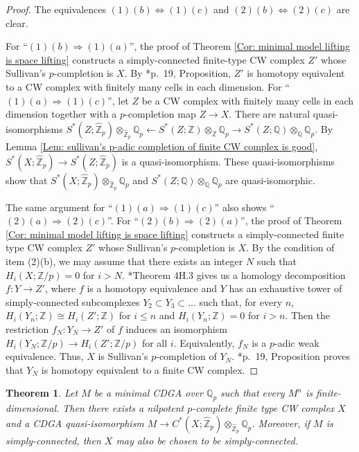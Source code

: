 \documentclass[11pt]{amsart}
\newtheorem{theorem}{Theorem}[section]
\theoremstyle{definition}
\numberwithin{equation}{section}
\numberwithin{equation}{section}
\newcommand\QQ{\mathbb{Q}}
\newcommand\ZZ{\mathbb{Z}}
\begin{document}
\begin{proof}
The equivalences $(1)(b)\Leftrightarrow (1)(c)$ and $(2)(b)\Leftrightarrow (2)(c)$ are clear.

For ``$(1)(b)\Rightarrow (1)(a)$'', the proof of Theorem \ref{Cor: minimal model lifting is space lifting} constructs a simply-connected finite-type CW complex $Z'$ whose Sullivan's $p$-completion is $X$. By \cite{Weinberger-stratified-spaces}*{p.~19, Proposition}, $Z'$ is homotopy equivalent to a CW complex with finitely many cells in each dimension. For ``$(1)(a)\Rightarrow (1)(c)$'', let $Z$ be a CW complex with finitely many cells in each dimension together with a $p$-completion map $Z\rightarrow X$. There are natural quasi-isomorphisms $S^*(Z;\widehat{\ZZ}_p)\otimes_{\widehat{\ZZ}_p}\QQ_p\leftarrow S^*(Z;\ZZ)\otimes_{\ZZ} \QQ_p \rightarrow S^*(Z;\QQ)\otimes_{\QQ}\QQ_p$. By Lemma \ref{Lem: sullivan's p-adic completion of finite CW complex is good}, $S^*(X;\widehat{\ZZ}_p)\rightarrow S^*(Z;\widehat{\ZZ}_p)$ is a quasi-isomorphism. These quasi-isomorphisms show that $S^*(X;\widehat{\ZZ}_p)\otimes_{\widehat{\ZZ}_p}\QQ_p$ and $ S^*(Z;\QQ)\otimes_{\QQ}\QQ_p$ are quasi-isomorphic.

The same argument for ``$(1)(a)\Rightarrow (1)(c)$'' also shows ``$(2)(a)\Rightarrow (2)(c)$''. For ``$(2)(b)\Rightarrow (2)(a)$'', the proof of Theorem \ref{Cor: minimal model lifting is space lifting} constructs a simply-connected finite type CW complex $Z'$ whose Sullivan's $p$-completion is $X$. By the condition of item (2)(b), we may assume that there exists an integer $N$ such that $H_i(X;\ZZ/p)=0$ for $i>N$. \cite{Hatcher-algebraic-topology}*{Theorem 4H.3} gives us a homology decomposition $f:Y\rightarrow Z'$, where $f$ is a homotopy equivalence and $Y$ has an exhaustive tower of simply-connected subcomplexes $Y_2\subset Y_3\subset ...$ such that, for every $n$, $H_i(Y_n;\ZZ)\cong H_i(Z';\ZZ)$ for $i\leq n$ and $H_i(Y_n;\ZZ)=0$ for $i>n$. Then the restriction $f_N:Y_N\rightarrow Z'$ of $f$ induces an isomorphism $H_i(Y_N;\ZZ/p)\rightarrow H_i(Z';\ZZ/p)$ for all $i$. Equivalently, $f_N$ is a $p$-adic weak equivalence. Thus, $X$ is Sullivan's $p$-completion of $Y_N$. \cite{Weinberger-stratified-spaces}*{p.~19, Proposition} proves that $Y_N$ is homotopy equivalent to a finite CW complex.
\end{proof}

\begin{theorem}\label{Thm: realization of a minimal model}
Let $M$ be a minimal CDGA over $\QQ_p$ such that every $M^n$ is finite-dimensional. Then there exists a nilpotent $p$-complete finite type CW complex $X$ and a CDGA quasi-isomorphism $M\rightarrow C^*(X;\widehat{\ZZ}_p)\otimes_{\widehat{\ZZ}_p} \QQ_p$. Moreover, if $M$ is simply-connected, then $X$ may also be chosen to be simply-connected.
\end{theorem}
\end{document}
